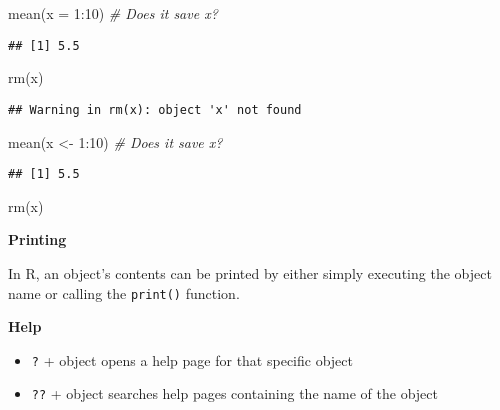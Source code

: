 \documentclass[
]{book}
\newenvironment{Shaded}{\begin{snugshade}}{\end{snugshade}}
\newcommand{\AttributeTok}[1]{\textcolor[rgb]{0.77,0.63,0.00}{#1}}
\newcommand{\CommentTok}[1]{\textcolor[rgb]{0.56,0.35,0.01}{\textit{#1}}}
\newcommand{\DecValTok}[1]{\textcolor[rgb]{0.00,0.00,0.81}{#1}}
\newcommand{\FunctionTok}[1]{\textcolor[rgb]{0.00,0.00,0.00}{#1}}
\newcommand{\NormalTok}[1]{#1}
\newcommand{\OtherTok}[1]{\textcolor[rgb]{0.56,0.35,0.01}{#1}}
\newcommand{\SpecialCharTok}[1]{\textcolor[rgb]{0.00,0.00,0.00}{#1}}
\providecommand{\tightlist}{%
  \setlength{\itemsep}{0pt}\setlength{\parskip}{0pt}}
\begin{document}
\begin{Shaded}
\begin{Highlighting}[]
\FunctionTok{mean}\NormalTok{(}\AttributeTok{x =} \DecValTok{1}\SpecialCharTok{:}\DecValTok{10}\NormalTok{) }\CommentTok{\# Does it save x?}
\end{Highlighting}
\end{Shaded}

\begin{verbatim}
## [1] 5.5
\end{verbatim}

\begin{Shaded}
\begin{Highlighting}[]
\FunctionTok{rm}\NormalTok{(x)}
\end{Highlighting}
\end{Shaded}

\begin{verbatim}
## Warning in rm(x): object 'x' not found
\end{verbatim}

\begin{Shaded}
\begin{Highlighting}[]
\FunctionTok{mean}\NormalTok{(x }\OtherTok{\textless{}{-}} \DecValTok{1}\SpecialCharTok{:}\DecValTok{10}\NormalTok{) }\CommentTok{\# Does it save x?}
\end{Highlighting}
\end{Shaded}

\begin{verbatim}
## [1] 5.5
\end{verbatim}

\begin{Shaded}
\begin{Highlighting}[]
\FunctionTok{rm}\NormalTok{(x)}
\end{Highlighting}
\end{Shaded}

\textbf{Printing}

In R, an object's contents can be printed by either simply executing the object name or calling the \texttt{print()} function.

\textbf{Help}

\begin{itemize}
\tightlist
\item
  \texttt{?} + object opens a help page for that specific object
\item
  \texttt{??} + object searches help pages containing the name of the object
\end{itemize}
\end{document}
